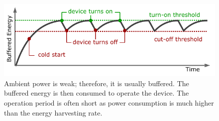 \begin{figure}[b]
	\centering
		\includegraphics[width=\columnwidth]{figures/intermittent_operation}
		\caption{Ambient power is weak; therefore, it is usually buffered. The buffered energy is then consumed to operate the device. The operation period is often short as power consumption is much higher than the energy harvesting rate.
		}
		\label{fig:intermittent_opertaion}
\end{figure} 
%
